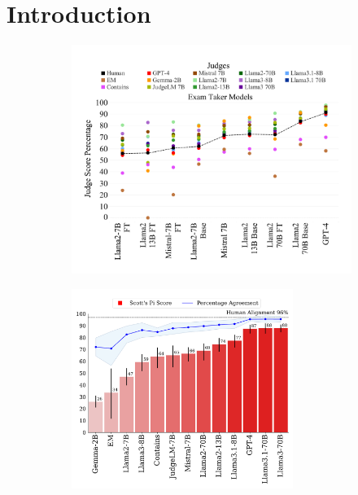 \section {Introduction} \label{sec:intro}

\begin{figure}[t]
    \centering
    \begin{subfigure}[b]{0.55\textwidth}
        \centering
        \includegraphics[width=\linewidth]{figures/Scores_HG_V3.pdf}
        \vspace{-6mm}
        \caption{}
        \vspace{-2mm}
        \label{fig:llmalignment_a}
    \end{subfigure}
    \hfill
    \begin{subfigure}[b]{0.44\textwidth}
        \centering\includegraphics[width=\linewidth, height=6.5cm]{figures/LLMAlignment_HG_V1.pdf}
        \vspace{-6mm}

\end{subfigure}
\end{figure}
